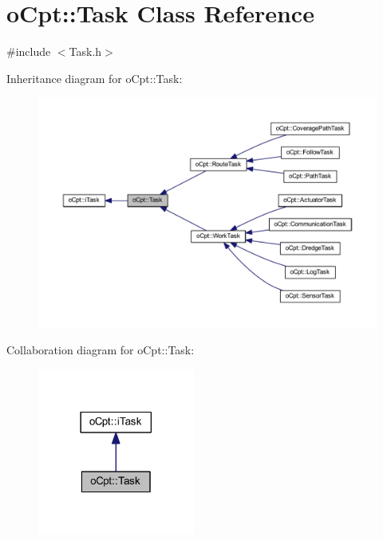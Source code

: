 \hypertarget{classo_cpt_1_1_task}{}\section{o\+Cpt\+:\+:Task Class Reference}
\label{classo_cpt_1_1_task}


{\ttfamily \#include $<$Task.\+h$>$}



Inheritance diagram for o\+Cpt\+:\+:Task\+:\nopagebreak
\begin{figure}[H]
\begin{center}
\leavevmode
\includegraphics[width=350pt]{classo_cpt_1_1_task__inherit__graph}
\end{center}
\end{figure}


Collaboration diagram for o\+Cpt\+:\+:Task\+:\nopagebreak
\begin{figure}[H]
\begin{center}
\leavevmode
\includegraphics[width=146pt]{classo_cpt_1_1_task__coll__graph}
\end{center}
\end{figure}
